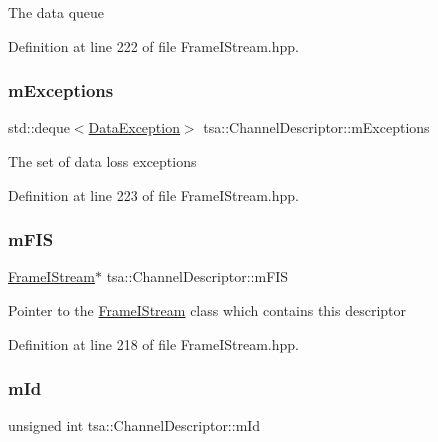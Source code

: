 The data queue 

Definition at line 222 of file Frame\+I\+Stream.\+hpp.

\mbox{\label{classtsa_1_1_channel_descriptor_ac4103a2793b7e507f8f982070ee27348}} 
\subsubsection{\texorpdfstring{m\+Exceptions}{mExceptions}}
{\footnotesize\ttfamily std\+::deque$<$\hyperlink{structtsa_1_1_data_exception}{Data\+Exception}$>$ tsa\+::\+Channel\+Descriptor\+::m\+Exceptions\hspace{0.3cm}{\ttfamily [protected]}}

The set of data loss exceptions 

Definition at line 223 of file Frame\+I\+Stream.\+hpp.

\mbox{\label{classtsa_1_1_channel_descriptor_a7767947e90a66d41bbd13bd4c54149a6}} 
\subsubsection{\texorpdfstring{m\+F\+IS}{mFIS}}
{\footnotesize\ttfamily \hyperlink{classtsa_1_1_frame_i_stream}{Frame\+I\+Stream}$\ast$ tsa\+::\+Channel\+Descriptor\+::m\+F\+IS\hspace{0.3cm}{\ttfamily [protected]}}

Pointer to the \hyperlink{classtsa_1_1_frame_i_stream}{Frame\+I\+Stream} class which contains this descriptor 

Definition at line 218 of file Frame\+I\+Stream.\+hpp.

\mbox{\label{classtsa_1_1_channel_descriptor_a49d1e3852cb22b0a56ebc03b3176c5b8}} 
\subsubsection{\texorpdfstring{m\+Id}{mId}}
{\footnotesize\ttfamily unsigned int tsa\+::\+Channel\+Descriptor\+::m\+Id\hspace{0.3cm}{\ttfamily [protected]}}


